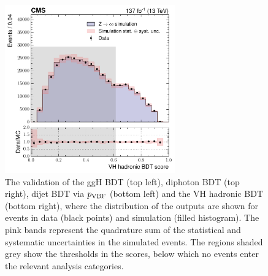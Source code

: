 \begin{figure}
  \hfill
  \includegraphics[height=7.25cm]{Figures/hgg_overview/DYValidation_VHBDT_VH_had_mvascore_ratioPlot.pdf}
  \caption[Validation of the event categorisation classifiers]
  {
    The validation of the ggH BDT (top left), diphoton BDT (top right), dijet BDT via $p_{\rm{VBF}}$ (bottom left) and the VH hadronic BDT (bottom right), where the distribution of the outputs are shown for \Zee events in data (black points) and simulation (filled histogram). The pink bands represent the quadrature sum of the statistical and systematic uncertainties in the simulated events. The regions shaded grey show the thresholds in the scores, below which no events enter the relevant analysis categories.
  }
  \label{fig:categorisation_validation}
\end{figure}

